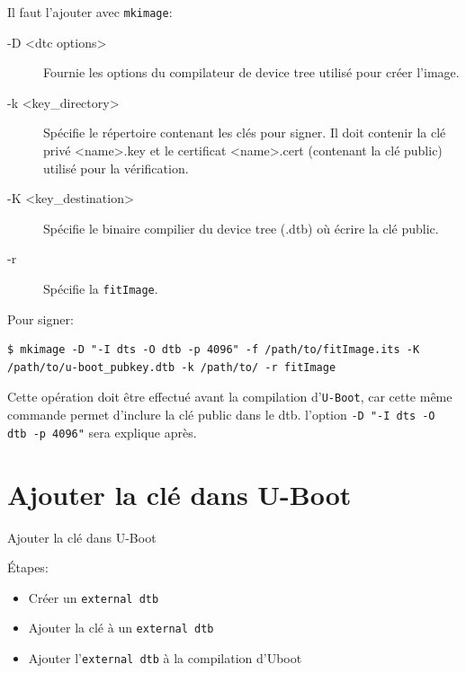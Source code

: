 \documentclass[aspectratio=169]{beamer}
\begin{document}
\begin{frame}[fragile]
Il faut l'ajouter avec \texttt{mkimage}:
\begin{description}
\item[-D <dtc options>] Fournie les options du compilateur de device tree utilisé pour créer l'image.
\item[-k <key\_directory>] Spécifie le répertoire contenant les clés pour signer. Il doit contenir la clé privé <name>.key et le certificat <name>.cert (contenant la clé public) utilisé pour la vérification.
\item[-K <key\_destination>] Spécifie le binaire compilier du device tree (.dtb) où écrire la clé public.
\item[-r] Spécifie la \texttt{fitImage}.
\end{description}
\end{frame}

\begin{frame}[fragile]
Pour signer:
\begin{lstlisting}[style=shell]
$ mkimage -D "-I dts -O dtb -p 4096" -f /path/to/fitImage.its -K /path/to/u-boot_pubkey.dtb -k /path/to/ -r fitImage
\end{lstlisting}
Cette opération doit être effectué avant la compilation d'\texttt{U-Boot}, car cette même commande permet d'inclure la clé public dans le dtb.
\vfill
l'option \texttt{-D "-I dts -O dtb -p 4096"} sera explique après.
\end{frame}



\section{Ajouter la clé dans U-Boot}

\begin{frame}
\begin{center}
\huge{Ajouter la clé dans U-Boot}
\end{center}
\end{frame}

\begin{frame}
Étapes:
\begin{center}
\begin{itemize}
	\item Créer un \texttt{external dtb}
	\item Ajouter la clé à un \texttt{external dtb}
	\item Ajouter l'\texttt{external dtb} à la compilation d'Uboot
\end{itemize}
\end{center}
\end{frame}
\end{document}
